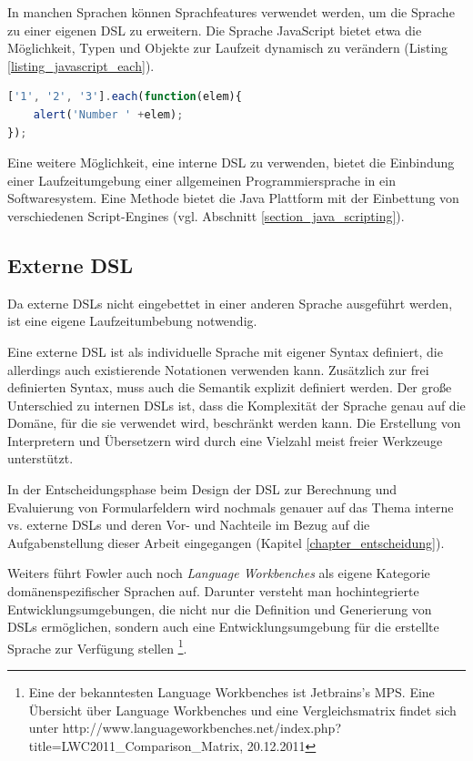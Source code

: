 In manchen Sprachen können Sprachfeatures verwendet werden, um die Sprache zu einer eigenen DSL zu erweitern. Die Sprache Java\-Script bietet etwa die Möglichkeit, Typen und Objekte zur Laufzeit dynamisch zu verändern (Listing \ref{listing_javascript_each}).\\

\begin{lstlisting}[language=JavaScript, caption={Erweiterung des Array-Typs um die Funktion \texttt{each()} in der Java\-Script Bibliothek Prototype},label=listing_javascript_each]
['1', '2', '3'].each(function(elem){
	alert('Number ' +elem);
});
\end{lstlisting}

Eine weitere Möglichkeit, eine interne DSL zu verwenden, bietet die Einbindung einer Laufzeitumgebung einer allgemeinen Programmiersprache in ein Softwaresystem. Eine Methode bietet die Java Plattform mit der Einbettung von verschiedenen Script-Engines (vgl. Abschnitt \ref{section_java_scripting}).

\subsection{Externe DSL} 

Da externe DSLs nicht eingebettet in einer anderen Sprache ausgeführt werden, ist eine eigene Laufzeitumbebung not\-wen\-dig. 

Eine externe DSL ist als individuelle Sprache mit eigener Syntax definiert, die allerdings auch existierende Notationen verwenden kann. Zu\-sätz\-lich zur frei definierten Syntax, muss auch die Semantik explizit definiert werden. Der große Unterschied zu internen DSLs ist, dass die Komplexität der Sprache genau auf die Domäne, für die sie verwendet wird, beschränkt werden kann. Die Erstellung von Interpretern und Übersetzern wird durch eine Vielzahl meist freier Werkzeuge unterstützt.

In der Entscheidungsphase beim Design der DSL zur Berechnung und Eva\-lu\-ier\-ung von Formularfeldern wird nochmals genauer 
auf das Thema interne vs. externe DSLs und deren Vor- und Nachteile im Bezug auf die Aufgabenstellung dieser 
Arbeit eingegangen (Kapitel \ref{chapter_entscheidung}).

Weiters führt Fowler auch noch \textit{Language Workbenches} als eigene Kategorie domänenspezifischer Sprachen auf. 
Darunter versteht man hochintegrierte Entwicklungsumgebungen, die nicht nur die Definition und Generierung von DSLs ermöglichen, 
sondern auch eine Entwicklungsumgebung für die erstellte Sprache zur Verfügung stellen
\footnote{Eine der bekanntesten Language Workbenches ist Jetbrains's MPS. Eine Über\-sicht über Language Workbenches und eine 
Vergleichsmatrix findet sich unter http://www.languageworkbenches.net/index.php?title=LWC2011\_Comparison\_Matrix, 20.12.2011}.



